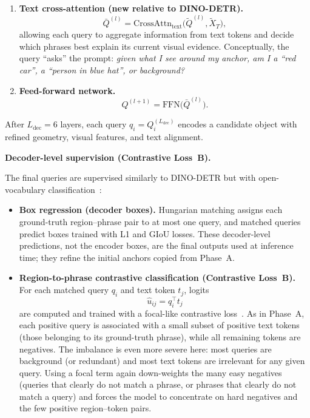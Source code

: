 \begin{enrichment}
\begin{enrichment}[Method][subsection]
\begin{enumerate}
			\item \textbf{Text cross-attention (new relative to DINO-DETR).}
			\[
			\bar{Q}^{(l)} = \text{CrossAttn}_{\text{text}}\bigl(\tilde{Q}^{(l)}, \tilde{X}_T\bigr),
			\]
			allowing each query to aggregate information from text tokens and decide which phrases best explain its current visual evidence. Conceptually, the query “asks” the prompt: \emph{given what I see around my anchor, am I a ``red car'', a ``person in blue hat'', or background?}
			
			\item \textbf{Feed-forward network.}
			\[
			Q^{(l+1)} = \text{FFN}\bigl(\bar{Q}^{(l)}\bigr).
			\]
		\end{enumerate}
		After \(L_{\text{dec}} = 6\) layers, each query \(q_i = Q^{(L_{\text{dec}})}_i\) encodes a candidate object with refined geometry, visual features, and text alignment.
		
		\newpage
		
		\noindent\textbf{Decoder-level supervision (Contrastive Loss~B).}
		
		The final queries are supervised similarly to DINO-DETR but with open-vocabulary classification~\cite{zhang2022_dino,liu2023_groundingdino}:
		\begin{itemize}
			\item \textbf{Box regression (decoder boxes).}  
			Hungarian matching assigns each ground-truth region–phrase pair to at most one query, and matched queries predict boxes trained with L1 and GIoU losses. These decoder-level predictions, not the encoder boxes, are the final outputs used at inference time; they refine the initial anchors copied from Phase~A.
			
			\item \textbf{Region-to-phrase contrastive classification (Contrastive Loss~B).}  
			For each matched query \(q_i\) and text token \(t_j\), logits
			\[
			\hat{u}_{ij} = q_i^\top t_j
			\]
			are computed and trained with a focal-like contrastive loss~\cite{liu2023_groundingdino}. As in Phase~A, each positive query is associated with a small subset of positive text tokens (those belonging to its ground-truth phrase), while all remaining tokens are negatives. The imbalance is even more severe here: most queries are background (or redundant) and most text tokens are irrelevant for any given query. Using a focal term again down-weights the many easy negatives (queries that clearly do not match a phrase, or phrases that clearly do not match a query) and forces the model to concentrate on hard negatives and the few positive region–token pairs.
		\end{itemize}
		

\end{enrichment}
\end{enrichment}
